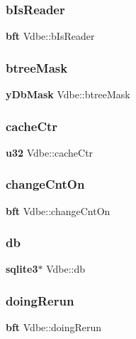 \mbox{\label{struct_vdbe_af090ad6018571a2487e8ba1616a8c5ce}} 
\subsubsection{bIsReader}
{\footnotesize\ttfamily \textbf{ bft} Vdbe\+::b\+Is\+Reader}

\mbox{\label{struct_vdbe_a82cb99588b3650e6f10583275392ce7c}} 
\subsubsection{btreeMask}
{\footnotesize\ttfamily \textbf{ y\+Db\+Mask} Vdbe\+::btree\+Mask}

\mbox{\label{struct_vdbe_ace5722464070f2055f536b737955b9ad}} 
\subsubsection{cacheCtr}
{\footnotesize\ttfamily \textbf{ u32} Vdbe\+::cache\+Ctr}

\mbox{\label{struct_vdbe_a2eafa7984a14e56f31e46fa4b90b0582}} 
\subsubsection{changeCntOn}
{\footnotesize\ttfamily \textbf{ bft} Vdbe\+::change\+Cnt\+On}

\mbox{\label{struct_vdbe_a495366101a593999f4d2ed905e839029}} 
\subsubsection{db}
{\footnotesize\ttfamily \textbf{ sqlite3}$\ast$ Vdbe\+::db}

\mbox{\label{struct_vdbe_aacf1f57675f3c37a924aba5c74e035ea}} 
\subsubsection{doingRerun}
{\footnotesize\ttfamily \textbf{ bft} Vdbe\+::doing\+Rerun}

\mbox{\label{struct_vdbe_ab2fde65c1d4728e92d100ce21313dcd3}} 
